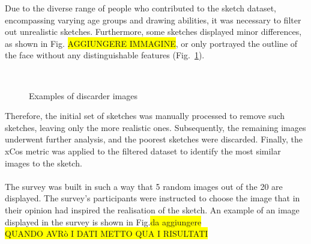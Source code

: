 \noindent Due to the diverse range of people who contributed to the sketch dataset, encompassing varying age groups and drawing abilities, it was necessary to filter out unrealistic sketches. Furthermore, some sketches displayed minor differences, as shown in Fig. \colorbox{yellow}{AGGIUNGERE IMMAGINE}, or only portrayed the outline of the face without any distinguishable features (Fig.~\ref{fig:discarded images}).
\begin{figure}[htbp]
    \centering
     \quad
    \\
    \caption{Examples of discarder images}
    \label{fig:discarded images}
\end{figure}
Therefore, the initial set of sketches was manually processed to remove such sketches, leaving only the more realistic ones. Subsequently, the remaining images underwent further analysis, and the poorest sketches were discarded. Finally, the xCos metric was applied to the filtered dataset to identify the most similar images to the sketch.\\ \\
%
%
%
The survey was built in such a way that 5 random images out of the 20 are displayed. The survey's participants were instructed to choose the image that in their opinion had inspired the realisation of the sketch. An example of an image displayed in the survey is shown in Fig.\colorbox{yellow}{da aggiungere}
\\
\colorbox{yellow}{QUANDO AVRò I DATI METTO QUA I RISULTATI}
%
%
%



